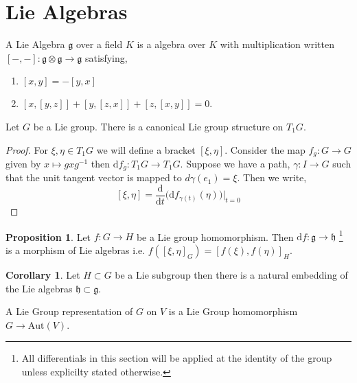 \documentclass[12pt]{extarticle}
\theoremstyle{definition}
\newtheorem{proposition}[theorem]{Proposition}
\newtheorem{corollary}[theorem]{Corollary}
\newenvironment{definition}[1][Definition:]{\begin{trivlist}
\item[\hskip \labelsep {\bfseries #1}]}{\end{trivlist}}
\renewcommand{\d}[1]{\mathrm{d} #1}
\newcommand{\deriv}[2]{\frac{\d{#1}}{\d{#2}}}
\newcommand{\Aut}[1]{\mathrm{Aut}\left( #1 \right)}
\begin{document}
\section{Lie Algebras}

\newcommand{\g}{\mathfrak{g}}

\begin{definition}
A Lie Algebra $\g$ over a field $K$ is a algebra over $K$ with multiplication written $[- , - ] : \g \otimes \g \to \g$ satisfying,
\begin{enumerate}
\item $[x,y] = -[y,x]$

\item $[x, [y, z]] + [y, [z, x]] + [z, [x, y]] = 0$. 
\end{enumerate}
\end{definition}

\begin{definition}
Let $G$ be a Lie group. There is a canonical Lie group structure on $T_{1} G$.
\end{definition}

\begin{proof}
For $\xi, \eta \in T_{1} G$ we will define a bracket $[\xi, \eta]$. Consider the map $f_g : G \to G$ given by $x \mapsto g x g^{-1}$ then $\d{f}_g : T_{1} G \to T_{1} G$. Suppose we have a path, $\gamma : I \to G$ such that the unit tangent vector is mapped to $d \gamma(e_1) = \xi$. Then we write,
\[ [\xi, \eta] = \deriv{}{t} \Big( \d{f}_{\gamma(t)}(\eta) \Big) \Big|_{t = 0} \]  
\end{proof}

\newcommand{\h}{\mathfrak{h}}

\begin{proposition}
Let $f : G \to H$ be a Lie group homomorphism. Then $\d{f} : \g \to \h$ \footnote{All differentials in this section will be applied at the identity of the group unless explicilty stated otherwise.} is a morphism of Lie algebras i.e. $f([\xi, \eta]_G) = [f(\xi), f(\eta)]_H$. 
\end{proposition}

\begin{corollary}
Let $H \subset G$ be a Lie subgroup then there is a natural embedding of the Lie algebras $\h \subset \g$. 
\end{corollary}

\begin{definition}
A Lie Group representation of $G$ on $V$ is a Lie Group homomorphism $G \to \Aut{V}$. 
\end{definition}
\end{document}
